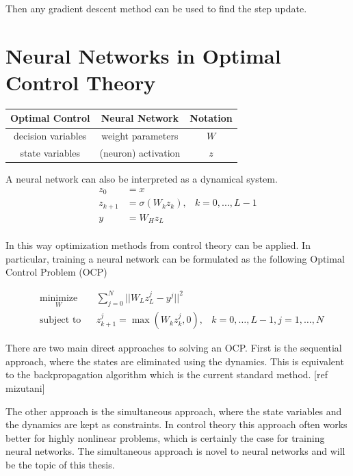  Then any gradient descent method can be used to find the step update.


\section{Neural Networks in Optimal Control Theory}

\begin{table}
\begin{tabular}{c | c | c }
Optimal Control & Neural Network & Notation\\ \hline
decision variables & weight parameters & $W$\\
state variables & (neuron) activation & $z$\\
\end{tabular}
\end{table}

A neural network can also be interpreted as a dynamical system.
\begin{equation*}
	\begin{aligned}
	z_0 &= x \\
	z_{k+1} &= \sigma(W_kz_k), & k = 0,...,L-1 \\
	y &= W_Hz_L \\
	\end{aligned}
\end{equation*}

In this way optimization methods from control theory can be applied. In particular, training a neural network can be formulated as the following Optimal Control Problem (OCP)

\begin{equation*}
	\begin{aligned}
	& \underset{W}{\text{minimize}}
	& & \sum\limits_{j=0}^{N}||W_Lz_L^j - y^j||^2 \\
	& \text{subject to}
	& & z_{k+1}^j = \max(W_kz_k^j,0), &k = 0,\ldots,L-1,j = 1,\ldots,N
	\end{aligned}
\end{equation*}

There are two main direct approaches to solving an OCP. First is the sequential approach, where the states are eliminated using the dynamics. This is equivalent to the backpropagation algorithm which is the current standard method. [ref mizutani]

The other approach is the simultaneous approach, where the state variables and the dynamics are kept as constraints. In control theory this approach often works better for highly nonlinear problems, which is certainly the case for training neural networks. The simultaneous approach is novel to neural networks and will be the topic of this thesis.

